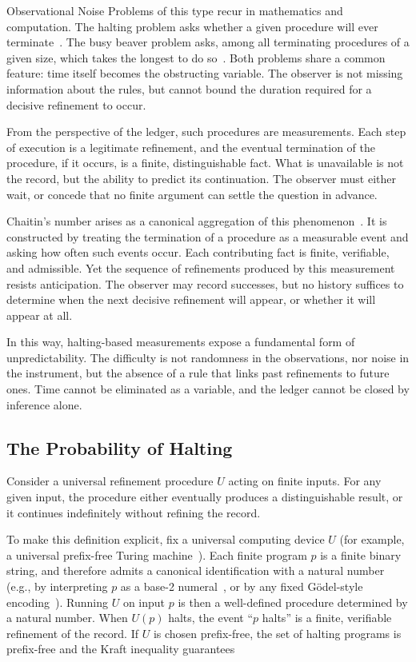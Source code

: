 \begin{coda}{Observational Noise}
Problems of this type recur in mathematics and computation. The
halting problem asks whether a given procedure will ever terminate~\cite{turing1936}. 
The busy
beaver problem asks, among all terminating procedures of a given size, which
takes the longest to do so~\cite{rado1962}. Both problems share a common feature: time itself
becomes the obstructing variable. The observer is not missing information
about the rules, but cannot bound the duration required for a decisive
refinement to occur.

From the perspective of the ledger, such procedures are 
measurements. Each step of execution is a legitimate refinement, and the
eventual termination of the procedure, if it occurs, is a finite,
distinguishable fact. What is unavailable is not the record, but the ability
to predict its continuation. The observer must either wait, or concede that
no finite argument can settle the question in advance.

Chaitin’s number arises as a canonical aggregation of this phenomenon~\cite{chaitin1975}. It is
constructed by treating the termination of a procedure as a measurable event
and asking how often such events occur. Each contributing fact is finite,
verifiable, and admissible. Yet the sequence of refinements produced by this
measurement resists anticipation. The observer may record successes, but no
history suffices to determine when the next decisive refinement will appear,
or whether it will appear at all.

In this way, halting-based measurements expose a fundamental form of
unpredictability. The difficulty is not randomness in the observations, nor
noise in the instrument, but the absence of a rule that links past refinements
to future ones. Time cannot be eliminated as a variable, and the ledger cannot
be closed by inference alone.

\subsection*{The Probability of Halting}
Consider a universal refinement procedure $U$ acting on finite inputs.
For any given input, the procedure either eventually produces a
distinguishable result, or it continues indefinitely without refining
the record.

To make this definition explicit, fix a universal computing device $U$ (for
example, a universal prefix-free Turing machine~\cite{turing1936}). Each finite program $p$ is a
finite binary string, and therefore admits a canonical identification with a
natural number (e.g., by interpreting $p$ as a base-2 numeral~\cite{vonneumann1945}, or by any fixed
G\"odel-style encoding~\cite{godel1931}). Running $U$ on input $p$ is then a well-defined
procedure determined by a natural number. When $U(p)$ halts, the event
``$p$ halts'' is a finite, verifiable refinement of the record. If $U$ is chosen
prefix-free, the set of halting programs is prefix-free and the Kraft inequality
guarantees~\cite{kraft1949}


\end{coda}
